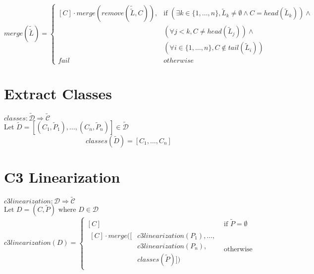\documentclass{article}
\begin{document}
\[
merge(\tilde{\tilde{L}}) =
\begin{cases}
[C] \cdot merge(remove(\tilde{\tilde{L}}, C)), & \text{if } (\exists k \in \{1, \ldots, n\}, \tilde{L}_k \neq \emptyset \land C = head(\tilde{L}_k)) \land \\
& (\forall j < k, C \neq head(\tilde{L}_j)) \land \\ 
& (\forall i \in \{1,\ldots,n\},C \notin tail(\tilde{L}_i)) \\ 

fail  & otherwise
\end{cases}
\]

\vspace{2cm}
\section*{Extract Classes}
$classes : \tilde{\mathcal{D}} \Rightarrow \tilde{\mathcal{C}}$\\
Let $\tilde{D} = [(C_1, \tilde{P}_1), \ldots, (C_n, \tilde{P}_n)] \in \mathcal{\tilde{D}}$ \\

\[
classes(\tilde{D}) = [C_1, \ldots, C_n]
\]
\vspace{2cm}
\section*{C3 Linearization}
$c3linearization : \mathcal{D} \Rightarrow \tilde{\mathcal{C}}$\\
$\text{Let } D = (C, \tilde{P}) \text{ where } D \in \mathcal{D}$\\
\[
c3linearization(D) =
\begin{cases}
[C] & \text{if } \tilde{P} = \emptyset \\
\begin{split}
[C] \cdot merge([&c3linearization(P_1), \ldots, \\
         &c3linearization(P_n), \\
         &classes(\tilde{P})]) 
\end{split} & \text{otherwise}
\end{cases}
\]
\end{document}
